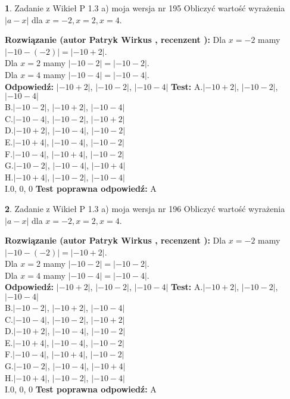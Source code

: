\documentclass[12pt, a4paper]{article}
\theoremstyle{definition} %
\newtheorem{zad}{}
\newcommand{\zadStart}[1]{\begin{zad}#1\newline}
\newcommand{\zadStop}{\end{zad}}
\newcommand{\rozwStart}[2]{\noindent \textbf{Rozwiązanie (autor #1 , recenzent #2): }\newline}
\newcommand{\rozwStop}{\newline}
\newcommand{\odpStart}{\noindent \textbf{Odpowiedź:}\newline}
\newcommand{\odpStop}{\newline}
\newcommand{\testStart}{\noindent \textbf{Test:}\newline}
\newcommand{\testStop}{\newline}
\newcommand{\kluczStart}{\noindent \textbf{Test poprawna odpowiedź:}\newline}
\newcommand{\kluczStop}{\newline}
\begin{document}
\zadStart{Zadanie z Wikieł P 1.3 a) moja wersja nr 195}
Obliczyć wartość wyrażenia $|a - x|$ dla $x=-2,x=2,x=4$.
\zadStop
\rozwStart{Patryk Wirkus}{}
Dla $x = -2$ mamy $|-10 - (-2)| = |-10 + 2|$.\\
Dla $x = 2$ mamy $|-10 - 2| = |-10 - 2|$.\\
Dla $x = 4$ mamy $|-10 - 4| = |-10 - 4|$.\\
\rozwStop
\odpStart
$|-10 + 2|$, $|-10 - 2|$, $|-10 - 4|$
\odpStop
\testStart
A.$|-10 + 2|$, $|-10 - 2|$, $|-10 - 4|$\\
B.$|-10 - 2|$, $|-10 + 2|$, $|-10 - 4|$\\
C.$|-10 - 4|$, $|-10 - 2|$, $|-10 + 2|$\\
D.$|-10 + 2|$, $|-10 - 4|$, $|-10 - 2|$\\
E.$|-10 + 4|$, $|-10 - 4|$, $|-10 - 2|$\\
F.$|-10 - 4|$, $|-10 + 4|$, $|-10 - 2|$\\
G.$|-10 - 2|$, $|-10 - 4|$, $|-10 + 4|$\\
H.$|-10 + 4|$, $|-10 - 2|$, $|-10 - 4|$\\
I.$0$, $0$, $0$
\testStop
\kluczStart
A
\kluczStop



\zadStart{Zadanie z Wikieł P 1.3 a) moja wersja nr 196}
Obliczyć wartość wyrażenia $|a - x|$ dla $x=-2,x=2,x=4$.
\zadStop
\rozwStart{Patryk Wirkus}{}
Dla $x = -2$ mamy $|-10 - (-2)| = |-10 + 2|$.\\
Dla $x = 2$ mamy $|-10 - 2| = |-10 - 2|$.\\
Dla $x = 4$ mamy $|-10 - 4| = |-10 - 4|$.\\
\rozwStop
\odpStart
$|-10 + 2|$, $|-10 - 2|$, $|-10 - 4|$
\odpStop
\testStart
A.$|-10 + 2|$, $|-10 - 2|$, $|-10 - 4|$\\
B.$|-10 - 2|$, $|-10 + 2|$, $|-10 - 4|$\\
C.$|-10 - 4|$, $|-10 - 2|$, $|-10 + 2|$\\
D.$|-10 + 2|$, $|-10 - 4|$, $|-10 - 2|$\\
E.$|-10 + 4|$, $|-10 - 4|$, $|-10 - 2|$\\
F.$|-10 - 4|$, $|-10 + 4|$, $|-10 - 2|$\\
G.$|-10 - 2|$, $|-10 - 4|$, $|-10 + 4|$\\
H.$|-10 + 4|$, $|-10 - 2|$, $|-10 - 4|$\\
I.$0$, $0$, $0$
\testStop
\kluczStart
A
\kluczStop
\end{document}

